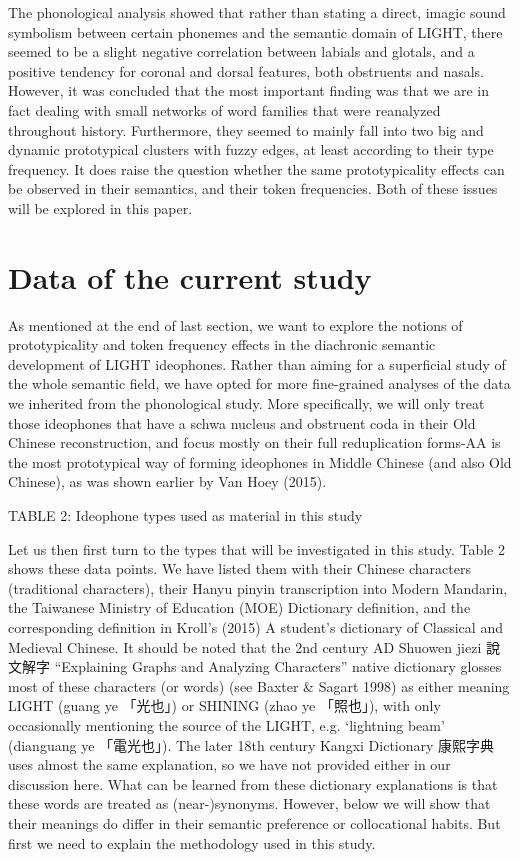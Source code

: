 \documentclass[12pt,article,oneside]{memoir}
\theoremstyle{definition}
\theoremstyle{definition}
\theoremstyle{definition}
\theoremstyle{remark}
\begin{document}
The phonological analysis showed that rather than stating a direct,
imagic sound symbolism between certain phonemes and the semantic domain
of LIGHT, there seemed to be a slight negative correlation between
labials and glotals, and a positive tendency for coronal and dorsal
features, both obstruents and nasals. However, it was concluded that the
most important finding was that we are in fact dealing with small
networks of word families that were reanalyzed throughout history.
Furthermore, they seemed to mainly fall into two big and dynamic
prototypical clusters with fuzzy edges, at least according to their type
frequency. It does raise the question whether the same prototypicality
effects can be observed in their semantics, and their token frequencies.
Both of these issues will be explored in this paper.

\section{Data of the current study}\label{data-of-the-current-study}

As mentioned at the end of last section, we want to explore the notions
of prototypicality and token frequency effects in the diachronic
semantic development of LIGHT ideophones. Rather than aiming for a
superficial study of the whole semantic field, we have opted for more
fine-grained analyses of the data we inherited from the phonological
study. More specifically, we will only treat those ideophones that have
a schwa nucleus and obstruent coda in their Old Chinese reconstruction,
and focus mostly on their full reduplication forms-AA is the most
prototypical way of forming ideophones in Middle Chinese (and also Old
Chinese), as was shown earlier by Van Hoey (2015).

TABLE 2: Ideophone types used as material in this study

Let us then first turn to the types that will be investigated in this
study. Table 2 shows these data points. We have listed them with their
Chinese characters (traditional characters), their Hanyu pinyin
transcription into Modern Mandarin, the Taiwanese Ministry of Education
(MOE) Dictionary definition, and the corresponding definition in Kroll's
(2015) A student's dictionary of Classical and Medieval Chinese. It
should be noted that the 2nd century AD Shuowen jiezi 說文解字
``Explaining Graphs and Analyzing Characters'' native dictionary glosses
most of these characters (or words) (see Baxter \& Sagart 1998) as
either meaning LIGHT (guang ye 「光也」) or SHINING (zhao ye 「照也」),
with only occasionally mentioning the source of the LIGHT, e.g.
`lightning beam' (dianguang ye 「電光也」). The later 18th century
Kangxi Dictionary 康熙字典 uses almost the same explanation, so we have
not provided either in our discussion here. What can be learned from
these dictionary explanations is that these words are treated as
(near-)synonyms. However, below we will show that their meanings do
differ in their semantic preference or collocational habits. But first
we need to explain the methodology used in this study.
\end{document}
